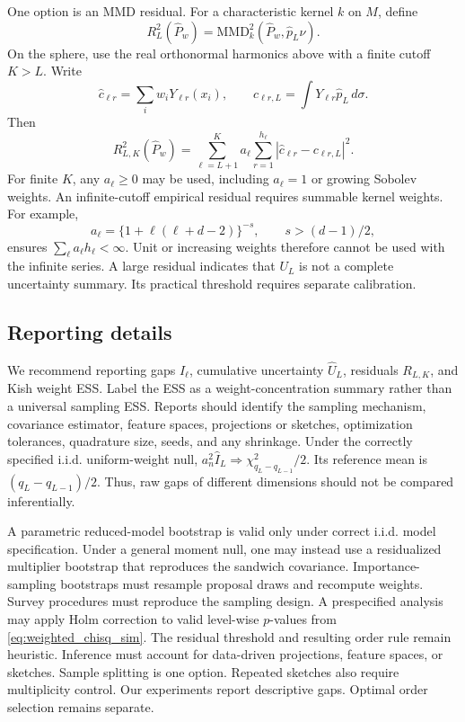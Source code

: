 \documentclass[twoside]{article}
\theoremstyle{definition}
\theoremstyle{remark}
\begin{document}
One option is an MMD residual. For a characteristic kernel $k$ on $M$, define
\begin{equation*}
  R_L^2(\widehat P_w)
  =\mathrm{MMD}_k^2(\widehat P_w,\widehat p_L\nu).  
\end{equation*}
On the sphere, use the real orthonormal harmonics above with a finite cutoff $K>L$. Write
\[
 \widehat c_{\ell r}=\sum_iw_iY_{\ell r}(x_i),\qquad
 c_{\ell r,L}=\int Y_{\ell r}\widehat p_L\,d\sigma.
\]
Then
\begin{equation}
  R_{L,K}^2(\widehat P_w)
  =\sum_{\ell=L+1}^{K} a_\ell\sum_{r=1}^{h_\ell}
  \left|\widehat c_{\ell r}-c_{\ell r,L}\right|^2.
  \label{eq:harmonic_residual}
\end{equation}
For finite $K$, any $a_\ell\ge0$ may be used, including $a_\ell=1$ or growing Sobolev weights. An infinite-cutoff empirical residual requires summable kernel weights. For example,
\[
 a_\ell=\{1+\ell(\ell+d-2)\}^{-s},\qquad s>(d-1)/2,
\]
ensures $\sum_\ell a_\ell h_\ell<\infty$. Unit or increasing weights therefore cannot be used with the infinite series. A large residual indicates that $U_L$ is not a complete uncertainty summary. Its practical threshold requires separate calibration.



\subsection{Reporting details}
\label{app:reporting}

We recommend reporting gaps $\widehat I_\ell$, cumulative uncertainty $\widehat U_L$, residuals $R_{L,K}$, and Kish weight ESS. Label the ESS as a weight-concentration summary rather than a universal sampling ESS. Reports should identify the sampling mechanism, covariance estimator, feature spaces, projections or sketches, optimization tolerances, quadrature size, seeds, and any shrinkage. Under the correctly specified i.i.d. uniform-weight null, $a_n^2\widehat I_L\Rightarrow\chi^2_{q_L-q_{L-1}}/2$. Its reference mean is $(q_L-q_{L-1})/2$. Thus, raw gaps of different dimensions should not be compared inferentially.

A parametric reduced-model bootstrap is valid only under correct i.i.d. model specification. Under a general moment null, one may instead use a residualized multiplier bootstrap that reproduces the sandwich covariance. Importance-sampling bootstraps must resample proposal draws and recompute weights. Survey procedures must reproduce the sampling design. A prespecified analysis may apply Holm correction to valid level-wise $p$-values from \eqref{eq:weighted_chisq_sim}. The residual threshold and resulting order rule remain heuristic. Inference must account for data-driven projections, feature spaces, or sketches. Sample splitting is one option. Repeated sketches also require multiplicity control. Our experiments report descriptive gaps. Optimal order selection remains separate.
\end{document}
